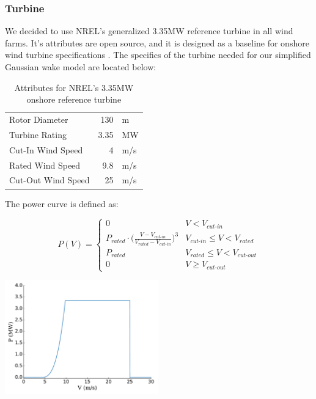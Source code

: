 \subsubsection{Turbine} \label{sec:turb}
	We decided to use NREL's generalized 3.35MW reference turbine in all wind farms.
	It's attributes are open source, and it is designed as a baseline for onshore wind turbine specifications \cite{NREL335MW}.
	The specifics of the turbine needed for our simplified Gaussian wake model are located below:

	\begin{table}
		\begin{center}
			\caption{Attributes for NREL's 3.35MW onshore reference turbine}
			\label{tab:335MW}
			\begin{tabular}{@{}lrl@{}}
			\toprule
				Rotor Diameter & 130 & m \\ 
				Turbine Rating & 3.35 & MW \\ 
				Cut-In Wind Speed & 4 & m/s \\ 
				Rated Wind Speed & 9.8 & m/s \\ 
				Cut-Out Wind Speed & 25 & m/s \\
			\bottomrule
			\end{tabular}
		\end{center}
	\end{table}
		
	\noindent The power curve is defined as:   

	\begin{minipage}{0.53\textwidth}
		\begin{equation*}
			P(V) = 
			\begin{cases} 
				0 & V < V_{\textit{cut-in}} \\
				P_{\textit{rated}}\cdot\bigg(\frac{V-V_{\textit{cut-in}}}{V_{\textit{rated}}-V_{\textit{cut-in}}}\bigg)^3 & V_{\textit{cut-in}}\leq V < V_{\textit{rated}} \\
				P_{\textit{rated}} & V_{\textit{rated}} \leq V < V_{\textit{cut-out}} \\
				0 & V \geq V_{\textit{cut-out}}
			\end{cases}
		\label{eq:power}
		\end{equation*}
	\end{minipage}\quad
	\begin{minipage}{0.53\textwidth}
		\includegraphics[width=2.6in]{./figures/iea37-335mw-pcurve.pdf}
	\end{minipage}

